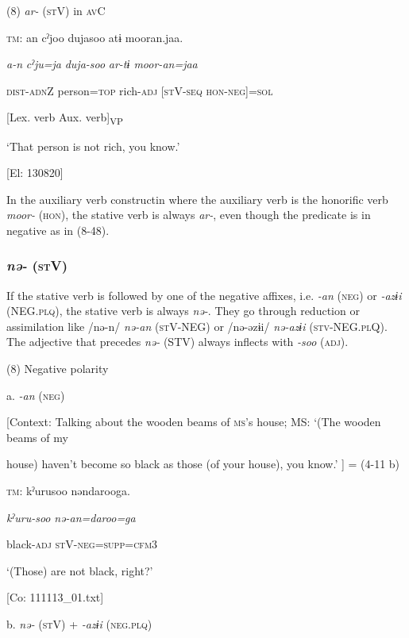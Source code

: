 (8)  \textit{ar-} (\textsc{st}V) in \textsc{av}C

  \textsc{tm}:  an  cˀjoo  dujasoo  atɨ  mooran.jaa.

    \textit{a-n}  \textit{cˀju=ja}  \textit{duja-soo}  \textit{ar{}-tɨ  moor-an=jaa}

    \textsc{dist}-\textsc{adn}Z  person=\textsc{top}  rich-\textsc{adj}  [\textsc{st}V-\textsc{seq}  \textsc{hon}-\textsc{neg}]=\textsc{sol}

          [Lex. verb  Aux. verb]\textsubscript{VP}

    ‘That person is not rich, you know.’

    [El: 130820]

In the auxiliary verb constructin where the auxiliary verb is the honorific verb \textit{moor-} (\textsc{hon}), the stative verb is always \textit{ar-}, even though the predicate is in negative as in (8-48).

\subsubsection{\textit{nə-} (\textsc{st}V)}

If the stative verb is followed by one of the negative affixes, i.e. \textit{{}-an} (\textsc{neg}) or \textit{{}-azɨi} (NEG.\textsc{plq}), the stative verb is always \textit{nə-}. They go through reduction or assimilation like /nə-n/ \textit{nə-an} (\textsc{st}V-NEG) or /nə-əzɨi/ \textit{nə-azɨi} (\textsc{stv}-NEG.\textsc{pl}Q). The adjective that precedes \textit{nə-} (STV) always inflects with \textit{{}-soo} (\textsc{adj}).

(8)  Negative polarity

  a.  \textit{{}-an} (\textsc{neg})

    [Context: Talking about the wooden beams of \textsc{ms}’s house; MS: ‘(The wooden beams of my

house) haven’t become so black as those (of your house), you know.’ ] = (4-11 b)

    \textsc{tm}:  kˀurusoo  nəndarooga.

      \textit{kˀuru-soo}  \textit{nə-an=daroo=ga}

      black-\textsc{adj}  \textsc{st}V-\textsc{neg}=\textsc{supp}=\textsc{cfm}3

      ‘(Those) are not black, right?’

      [Co: 111113\_01.txt]

  b.  \textit{nə-} (\textsc{st}V) + \textit{{}-azɨi} (\textsc{neg}.\textsc{plq})

